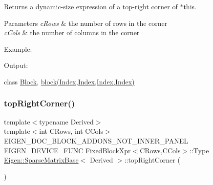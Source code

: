 \begin{DoxyReturn}{Returns}
a dynamic-\/size expression of a top-\/right corner of $\ast$this.
\end{DoxyReturn}

\begin{DoxyParams}{Parameters}
{\em c\+Rows} & the number of rows in the corner \\
\hline
{\em c\+Cols} & the number of columns in the corner\\
\hline
\end{DoxyParams}
Example\+: 
\begin{DoxyCodeInclude}{0}
\end{DoxyCodeInclude}
 Output\+: 
\begin{DoxyVerbInclude}
\end{DoxyVerbInclude}
 class \mbox{\hyperlink{class_eigen_1_1_block}{Block}}, \mbox{\hyperlink{class_eigen_1_1_sparse_matrix_base_a7c28a2f511181c727396d5e813519d38}{block(\+Index,\+Index,\+Index,\+Index)}} \mbox{\label{class_eigen_1_1_sparse_matrix_base_a4079d9bb1b0f18bb7f32f711608624b6}} 
\subsubsection{\texorpdfstring{topRightCorner()}{topRightCorner()}\hspace{0.1cm}{\footnotesize\ttfamily [2/3]}}
{\footnotesize\ttfamily template$<$typename Derived$>$ \\
template$<$int C\+Rows, int C\+Cols$>$ \\
E\+I\+G\+E\+N\+\_\+\+D\+O\+C\+\_\+\+B\+L\+O\+C\+K\+\_\+\+A\+D\+D\+O\+N\+S\+\_\+\+N\+O\+T\+\_\+\+I\+N\+N\+E\+R\+\_\+\+P\+A\+N\+EL E\+I\+G\+E\+N\+\_\+\+D\+E\+V\+I\+C\+E\+\_\+\+F\+U\+NC \mbox{\hyperlink{struct_eigen_1_1_sparse_matrix_base_1_1_fixed_block_xpr}{Fixed\+Block\+Xpr}}$<$C\+Rows,C\+Cols$>$\+::Type \mbox{\hyperlink{class_eigen_1_1_sparse_matrix_base}{Eigen\+::\+Sparse\+Matrix\+Base}}$<$ Derived $>$\+::top\+Right\+Corner (\begin{DoxyParamCaption}{ }\end{DoxyParamCaption})\hspace{0.3cm}{\ttfamily [inline]}}


